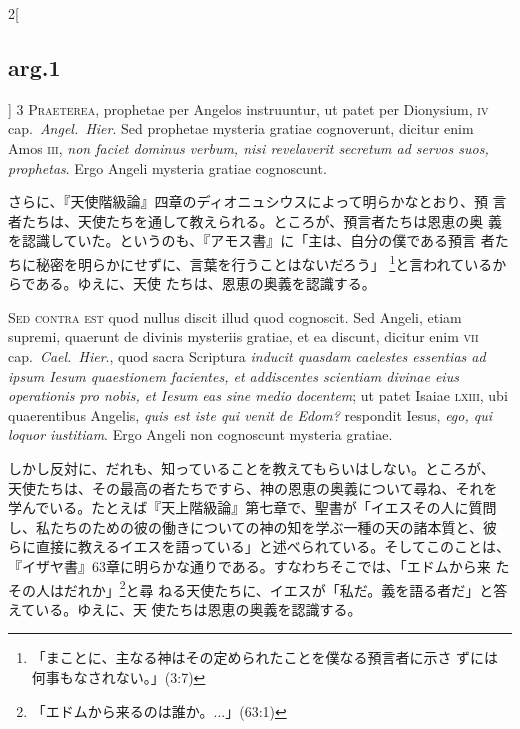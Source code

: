 \documentclass[paper=a4paper,fontsize=10pt,jafontsize=9pt,titlepage]{jlreq}
\begin{document}
\begin{paracol}{2}[\subsection{arg.1}]
{\scshape 3 Praeterea}, prophetae per Angelos instruuntur, ut patet
per Dionysium, {\scshape iv} cap.~{\itshape Angel.~Hier}. Sed
prophetae mysteria gratiae cognoverunt, dicitur enim Amos {\scshape
iii}, {\itshape non faciet dominus verbum, nisi revelaverit secretum
ad servos suos, prophetas}. Ergo Angeli mysteria gratiae cognoscunt.

\switchcolumn

さらに、『天使階級論』四章のディオニュシウスによって明らかなとおり、預
言者たちは、天使たちを通して教えられる。ところが、預言者たちは恩恵の奥
義を認識していた。というのも、『アモス書』に「主は、自分の僕である預言
者たちに秘密を明らかにせずに、言葉を行うことはないだろう」
\footnote{「まことに、主なる神はその定められたことを僕なる預言者に示さ
ずには何事もなされない。」(3:7)}と言われているからである。ゆえに、天使
たちは、恩恵の奥義を認識する。

\switchcolumn*[\subsection{s.c.}]

{\scshape Sed contra est} quod nullus discit illud quod cognoscit. Sed
Angeli, etiam supremi, quaerunt de divinis mysteriis gratiae, et ea
discunt, dicitur enim {\scshape vii} cap.~{\itshape Cael.~Hier}., quod
sacra Scriptura {\itshape inducit quasdam caelestes essentias ad ipsum
Iesum quaestionem facientes, et addiscentes scientiam divinae eius
operationis pro nobis, et Iesum eas sine medio docentem}; ut patet
Isaiae {\scshape lxiii}, ubi quaerentibus Angelis, {\itshape quis est
iste qui venit de Edom?} respondit Iesus, {\itshape ego, qui loquor
iustitiam}. Ergo Angeli non cognoscunt mysteria gratiae.

\switchcolumn

しかし反対に、だれも、知っていることを教えてもらいはしない。ところが、
天使たちは、その最高の者たちですら、神の恩恵の奥義について尋ね、それを
学んでいる。たとえば『天上階級論』第七章で、聖書が「イエスその人に質問
し、私たちのための彼の働きについての神の知を学ぶ一種の天の諸本質と、彼
らに直接に教えるイエスを語っている」と述べられている。そしてこのことは、
『イザヤ書』63章に明らかな通りである。すなわちそこでは、「エドムから来
たその人はだれか」\footnote{「エドムから来るのは誰か。...」(63:1)}と尋
ねる天使たちに、イエスが「私だ。義を語る者だ」と答えている。ゆえに、天
使たちは恩恵の奥義を認識する。



\end{paracol}
\end{document}
